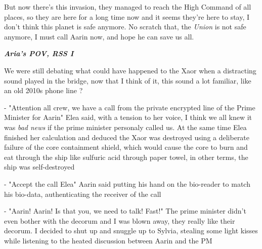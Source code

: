 \documentclass[colorlinks,12pt,a4paper]{book}
\begin{document}
But now there's this invasion, they managed to reach the High Command of all places, so they are here for a long time now and it seems 
they're here to stay, I don't think this planet is safe anymore. No scratch that, the \textit{Union} is not safe anymore, I must 
call Aarin now, and hope he can save us all.\par
\bigskip

\textit{\textbf{Aria's POV, RSS I}}\par
\bigskip
We were still debating what could have happened to the Xaor when a distracting sound played in the bridge, now that I think of it, this 
sound a lot familiar, like an old 2010s phone line ?\newline\par

- "Attention all crew, we have a call from the private encrypted line of the Prime Minister for Aarin" Elea said, with a tension 
to her voice, I think we all knew it was \textit{bad news} if the prime minister personaly called us. At the same time Elea
finished her calculation and deduced the Xaor was destroyed using a deliberate failure of the core containment shield, which
would cause the core to burn and eat through the ship like sulfuric acid through paper towel, in other terms, the ship was 
self-destroyed\newline\par
- "Accept the call Elea" Aarin said putting his hand on the bio-reader to match his bio-data, authenticating the receiver of the call\par
\bigskip 

- "Aarin! Aarin! Is that you, we need to talk! Fast!" The prime minister didn't even bother with the decorum and I was blown away,
they really like their decorum. I decided to shut up and snuggle up to Sylvia, stealing some light kisses while listening to the heated
discussion between Aarin and the PM\par 
\bigskip
\end{document}

